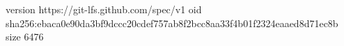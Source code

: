 version https://git-lfs.github.com/spec/v1
oid sha256:ebaca0e90da3bf9dccc20cdef757ab8f2bcc8aa33f4b01f2324eaaed8d71ec8b
size 6476
